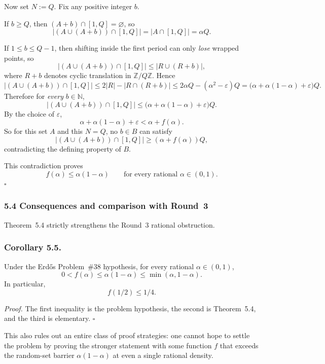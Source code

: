 Now set $N:=Q$. Fix any positive integer $b$.

If $b\ge Q$, then $(A+b)\cap[1,Q]=\varnothing$, so
\[
|(A\cup(A+b))\cap[1,Q]| = |A\cap[1,Q]|=\alpha Q.
\]

If $1\le b\le Q-1$, then shifting inside the first period can only \emph{lose} wrapped points, so
\[
|(A\cup(A+b))\cap[1,Q]|
\le |R\cup(R+b)|,
\]
where $R+b$ denotes cyclic translation in $\mathbb Z/Q\mathbb Z$. Hence
\[
|(A\cup(A+b))\cap[1,Q]|
\le 2|R|-|R\cap(R+b)|
\le 2\alpha Q-(\alpha^2-\varepsilon)Q
= \bigl(\alpha+\alpha(1-\alpha)+\varepsilon\bigr)Q.
\]
Therefore for \emph{every} $b\in\mathbb N$,
\[
|(A\cup(A+b))\cap[1,Q]|
\le \bigl(\alpha+\alpha(1-\alpha)+\varepsilon\bigr)Q.
\]
By the choice of $\varepsilon$,
\[
\alpha+\alpha(1-\alpha)+\varepsilon
< \alpha + f(\alpha).
\]
So for this set $A$ and this $N=Q$, no $b\in B$ can satisfy
\[
|(A\cup(A+b))\cap[1,Q]|\ge (\alpha+f(\alpha))Q,
\]
contradicting the defining property of $B$.

This contradiction proves
\[
 f(\alpha)\le \alpha(1-\alpha)
\qquad\text{for every rational }\alpha\in(0,1).
\]
\hfill$\square$

\subsubsection*{5.4 Consequences and comparison with Round~3}
Theorem~5.4 strictly strengthens the Round~3 rational obstruction.

\subsubsection*{Corollary 5.5.}
Under the Erd\H{o}s Problem~\#38 hypothesis, for every rational $\alpha\in(0,1)$,
\[
0<f(\alpha)\le \alpha(1-\alpha)\le \min(\alpha,1-\alpha).
\]
In particular,
\[
 f(1/2)\le 1/4.
\]

\emph{Proof.}
The first inequality is the problem hypothesis, the second is Theorem~5.4, and the third is elementary. \hfill$\square$

This also rules out an entire class of proof strategies: one cannot hope to settle the problem by proving the stronger statement with some function $f$ that exceeds the random-set barrier $\alpha(1-\alpha)$ at even a single rational density.

